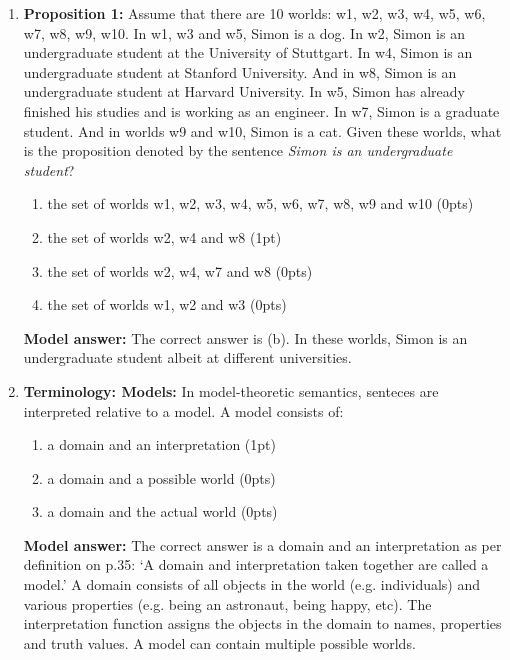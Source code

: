 \documentclass[a4,11pt]{article}
\begin{document}
\begin{enumerate}[leftmargin = 12pt]
 {\bf Model answer:} The correct answer is (a), as per the definition of a proposition on p.34. We do not know whether  \textit{Simon is an undergraduate student} is true in the actual world. But we can imagine possible worlds in which the sentence is true.
    
      \item {\bf Proposition 1:}  Assume that there are 10 worlds: w1, w2, w3, w4, w5, w6, w7, w8, w9, w10. In w1, w3 and w5, Simon is a dog. In w2, Simon is an undergraduate student at the University of Stuttgart. In w4, Simon is an undergraduate student at Stanford University. And in w8, Simon is an undergraduate student at Harvard University. In w5, Simon has already finished his studies and is working as an engineer. In w7, Simon is a graduate student. And in worlds w9 and w10, Simon is a cat.     
      Given these worlds, what is the proposition denoted by the sentence \textit{Simon is an undergraduate student}?
      
       \begin{enumerate}[noitemsep]
       \item the set of worlds w1, w2, w3, w4, w5, w6, w7, w8, w9 and w10 (0pts)
       \item the set of worlds w2, w4 and w8 (1pt)
       \item the set of worlds w2, w4, w7 and w8 (0pts)
       \item the set of worlds w1, w2 and w3 (0pts)       
    \end{enumerate}     

        {\bf Model answer:} The correct answer is (b). In these worlds, Simon is an undergraduate student albeit at different universities.

\item {\bf Terminology: Models:}  In model-theoretic semantics, senteces are interpreted relative to a model. A model consists of:
       \begin{enumerate}[noitemsep]
       \item a domain and an interpretation (1pt)
        \item a domain and a possible world (0pts)
        \item a domain and the actual world (0pts)
         \end{enumerate}
            
        {\bf Model answer:} The correct answer is a domain and an interpretation as per definition on p.35: `A domain and interpretation taken together are called a model.' A domain consists of all objects in the world (e.g. individuals) and various properties (e.g.  being an astronaut, being happy, etc). The interpretation function assigns the objects in the domain to names, properties and truth values. A model can contain multiple possible worlds.
    

\end{enumerate}
\end{document}
